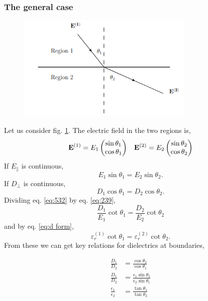 \documentclass{book}
\begin{document}
\subsubsection{The general case}
\begin{figure}
	\centering
	\includegraphics[width=0.75\textwidth]{interface1.png}
	\caption{}
	\label{fig:interface2}
\end{figure}
Let us consider fig. \ref{fig:interface2}. The electric field in the two regions is,
\begin{align}
	\vb{E}^{(1)} = E_1\begin{pmatrix}
		\sin\theta_1 \\ \cos\theta_1
	\end{pmatrix} && \vb{E}^{(2)} = E_2\begin{pmatrix}
	\sin\theta_2 \\ \cos\theta_2
	\end{pmatrix}
\end{align}
If $E_{\parallel}$ is continuous,
\begin{equation}
	E_1\sin\theta_1 = E_2\sin\theta_2. \label{eq:239}
\end{equation}
If $D_{\perp}$ is continuous,
\begin{equation}
	D_1\cos\theta_1 = D_2\cos\theta_2. \label{eq:532}
\end{equation}
Dividing eq. \eqref{eq:532} by eq. \eqref{eq:239}, 
\begin{equation}
	\frac{D_1}{E_1}\cot\theta_1 = \frac{D_2}{E_2}\cot\theta_2
\end{equation}
and by eq. \eqref{eq:d form},
\begin{equation}
	\varepsilon_r^{(1)}\cot\theta_1 = \varepsilon_r^{(2)}\cot\theta_2.
\end{equation}
From these we can get key relations for dielectrics at boundaries,
\begin{mybox}
	\begin{align}
		\frac{D_1}{D_2} & = \frac{\cos\theta_2}{\cos\theta_1} \\
		\frac{D_1}{D_2} & = \frac{\epsilon_1 \sin\theta_2}{\epsilon_2 \sin\theta_1} \\
		\frac{\epsilon_1}{\epsilon_2} & = \frac{\tan\theta_1}{\tan\theta_2}
	\end{align}
\end{mybox}
\end{document}
